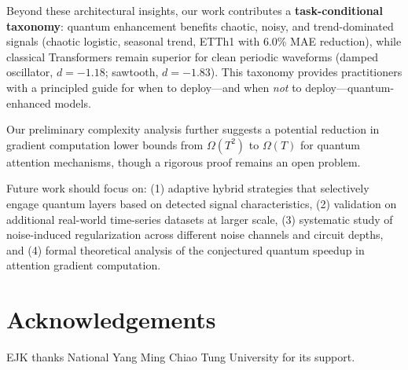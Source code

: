 \documentclass[conference]{IEEEtran}
\begin{document}
Beyond these architectural insights, our work contributes a \textbf{task-conditional taxonomy}: quantum enhancement benefits chaotic, noisy, and trend-dominated signals (chaotic logistic, seasonal trend, ETTh1 with 6.0\% MAE reduction), while classical Transformers remain superior for clean periodic waveforms (damped oscillator, $d = -1.18$; sawtooth, $d = -1.83$). This taxonomy provides practitioners with a principled guide for when to deploy---and when \emph{not} to deploy---quantum-enhanced models.

Our preliminary complexity analysis further suggests a potential reduction in gradient computation lower bounds from $\Omega(T^2)$ to $\Omega(T)$ for quantum attention mechanisms, though a rigorous proof remains an open problem.

Future work should focus on: (1) adaptive hybrid strategies that selectively engage quantum layers based on detected signal characteristics, (2) validation on additional real-world time-series datasets at larger scale, (3) systematic study of noise-induced regularization across different noise channels and circuit depths, and (4) formal theoretical analysis of the conjectured quantum speedup in attention gradient computation.






\section*{Acknowledgements}
EJK thanks National Yang Ming Chiao Tung University for its support.



\end{document}
